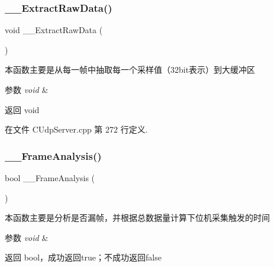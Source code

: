 \subsubsection{\texorpdfstring{\+\_\+\+\_\+\+Extract\+Raw\+Data()}{\_\_ExtractRawData()}}
{\footnotesize\ttfamily void \+\_\+\+\_\+\+Extract\+Raw\+Data (\begin{DoxyParamCaption}\item[{void}]{ }\end{DoxyParamCaption})\hspace{0.3cm}{\ttfamily [private]}}



本函数主要是从每一帧中抽取每一个采样值（32bit表示）到大缓冲区 


\begin{DoxyParams}{参数}
{\em void} & \\
\hline
\end{DoxyParams}
\begin{DoxyReturn}{返回}
void 
\end{DoxyReturn}


在文件 C\+Udp\+Server.\+cpp 第 272 行定义.

\mbox{\label{class_c_udp_server_ae0c29c53c86376894a6879fae8e4d6b1}} 
\subsubsection{\texorpdfstring{\+\_\+\+\_\+\+Frame\+Analysis()}{\_\_FrameAnalysis()}}
{\footnotesize\ttfamily bool \+\_\+\+\_\+\+Frame\+Analysis (\begin{DoxyParamCaption}\item[{void}]{ }\end{DoxyParamCaption})\hspace{0.3cm}{\ttfamily [private]}}



本函数主要是分析是否漏帧，并根据总数据量计算下位机采集触发的时间 


\begin{DoxyParams}{参数}
{\em void} & \\
\hline
\end{DoxyParams}
\begin{DoxyReturn}{返回}
bool，成功返回true；不成功返回false 
\end{DoxyReturn}



